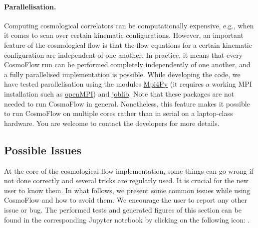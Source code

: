 \documentclass[11pt]{article}
\numberwithin{equation}{section} %
\begin{document}
\paragraph{Parallelisation.} Computing cosmological correlators can be computationally expensive, e.g., when it comes to scan over certain kinematic configurations. However, an important feature of the cosmological flow is that the flow equations for a certain kinematic configuration are independent of one another. In practice, it means that every \textsf{CosmoFlow} run can be performed completely independently of one another, and a fully parallelised implementation is possible. While developing the code, we have tested parallelisation using the modules \href{https://mpi4py.readthedocs.io/en/stable/}{\textsf{Mpi4Py}} (it requires a working MPI installation such as \href{https://www.open-mpi.org/}{\textsf{openMPI}}) and \href{https://joblib.readthedocs.io/en/stable/}{\textsf{joblib}}. Note that these packages are not needed to run \textsf{CosmoFlow} in general. Nonetheless, this feature makes it possible to run \textsf{CosmoFlow} on multiple cores rather than in serial on a laptop-class hardware. You are welcome to contact the developers for more details.


\subsection{Possible Issues}
\label{subsec: Possible Issues}

At the core of the cosmological flow implementation, some things can go wrong if not done correctly and several tricks are regularly used. It is crucial for the new user to know them. In what follows, we present some common issues while using \textsf{CosmoFlow} and how to avoid them. We encourage the user to report any other issue or bug. The performed tests and generated figures of this section can be found in the corresponding Jupyter notebook by clicking on the following icon: \href{https://github.com/deniswerth/CosmoFlow/blob/main/CosmoFlow/Massless_dphi3/PossibleIssues.ipynb}{\faGithub}.
\end{document}
